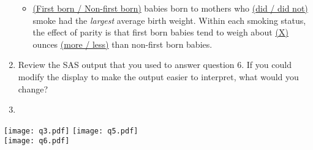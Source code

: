 \begin{enumerate}
\begin{itemize}
\item[] \doublespacing \underline{(First born / Non-first born)} babies born to mothers who \underline{(did / did not)} smoke had the \emph{largest} average birth weight.  Within each smoking status, the effect of parity is that first born babies tend to weigh about \underline{(X)} ounces \underline{(more / less)} than non-first born babies.
\end{itemize}
\item Review the SAS output that you used to answer question 6.  If you could modify the display to make the output easier to interpret, what would you change?
\item[]
\end{enumerate}
{}
\texttt{[image: q3.pdf]}
\emp
{}
\texttt{[image: q5.pdf]}\\
\texttt{[image: q6.pdf]}
\emp
 